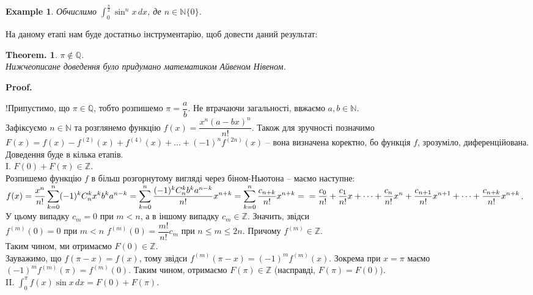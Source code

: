 \documentclass[a4paper, 10pt]{article}
\makeatletter
\def\huge{\displaystyle}
\def\qed{$\blacksquare$}
\theoremstyle{theoremdd}
\theoremstyle{theoremdd}
\newtheorem*{theorem*}{Theorem.}
\theoremstyle{theoremdd}
\theoremstyle{theoremdd}
\theoremstyle{theoremdd}
\newtheorem{example}[theorem]{Example}
\theoremstyle{theoremdd}
\theoremstyle{theoremdd}
\theoremstyle{theoremdd}
\theoremstyle{theoremdd}
\renewenvironment{proof}[1][Proof.\\]{\par
\pushQED{\hfill \qed}%
\normalfont \topsep6\p@\@plus6\p@\relax
\trivlist
\item\relax
{\bfseries
#1\@addpunct{.}}\hspace\labelsep\ignorespaces
}{%
\popQED\endtrivlist\@endpefalse
}
\makeatother
\begin{document}
\begin{example}
Обчислимо $\huge\int_0^{\frac{\pi}{2}} \sin^n x\,dx$, де $n \in \mathbb{N} \{0\}$.
\end{example}
\fi
\newpage

На даному етапі нам буде достатньо інструментарію, щоб довести даний результат:
\begin{theorem*}
$\pi \notin \mathbb{Q}$.\\
\textit{Нижчеописане доведення було придумано математиком Айвеном Нівеном.}
\end{theorem*}

\begin{proof}
!Припустимо, що $\pi \in \mathbb{Q}$, тобто розпишемо $\pi = \dfrac{a}{b}$. Не втрачаючи загальності, ввжаємо $a,b \in \mathbb{N}$.\\
Зафіксуємо $n \in \mathbb{N}$ та розглянемо функцію $f(x) = \dfrac{x^n (a-bx)^n}{n!}$. Також для зручності позначимо $F(x) = f(x) - f^{(2)}(x) + f^{(4)}(x) + \dots + (-1)^{n} f^{(2n)}(x)$ -- вона визначена коректно, бо функція $f$, зрозуміло, диференційована. Доведення буде в кілька етапів.
\bigskip \\
I. \textit{$F(0)+F(\pi) \in \mathbb{Z}$}.\\
Розпишемо функцію $f$ в більш розгорнутому вигляді через біном-Ньютона -- маємо наступне:\\
$f(x) = \dfrac{x^n}{n!} \displaystyle\sum_{k=0}^n (-1)^k C_n^k x^k b^k a^{n-k} = \sum_{k=0}^n \dfrac{(-1)^k C_n^k b^k a^{n-k}}{n!} x^{n+k} = \sum_{k=0}^n \dfrac{c_{n+k}}{n!}x^{n+k} = \\
= \dfrac{c_0}{n!} + \dfrac{c_1}{n!}x + \dots + \dfrac{c_n}{n!}x^n + \dfrac{c_{n+1}}{n!}x^{n+1} + \dots + \dfrac{c_{n+k}}{n!}x^{n+k}$.\\
У цьому випадку $c_m = 0$ при $m < n$, а в іншому випадку $c_m \in \mathbb{Z}$. Значить, звідси\\
$f^{(m)}(0) = 0$ при $m < n$ \qquad $f^{(m)}(0) = \dfrac{m!}{n!} c_m$ при $n \leq m \leq 2n$. Причому $f^{(m)} \in \mathbb{Z}$.\\
Таким чином, ми отримаємо $F(0) \in \mathbb{Z}$.\\
Зауважимо, що $f(\pi - x) = f(x)$, тому звідси $f^{(m)}(\pi-x) = (-1)^m f^{(m)}(x)$. Зокрема при $x = \pi$ маємо $(-1)^m f^{(m)}(\pi) = f^{(m)}(0)$. Таким чином, отримаємо $F(\pi) \in \mathbb{Z}$ (насправді, $F(\pi) = F(0)$).
\bigskip \\
II. \textit{$\displaystyle\int_0^{\pi} f(x)\sin x\,dx = F(0) + F(\pi)$.}\\

\end{proof}
\end{document}
